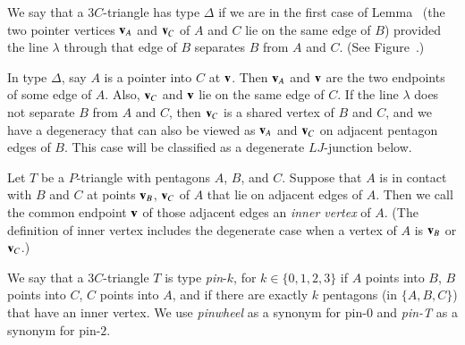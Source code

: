\begin{definition}[$\Delta$]
  We say that a $3C$-triangle has type $\Delta$ if we are in the first
  case of Lemma~ (the two pointer vertices ${\mathbf v}_A$ and
  ${\mathbf v}_C$ of $A$ and $C$ lie on the same edge of $B$) provided the line
  $\lambda$ through that edge of $B$ separates $B$ from $A$ and
  $C$. (See Figure~.)
\end{definition}



In type $\Delta$, say $A$ is a pointer into $C$ at ${\mathbf v}$.  Then ${\mathbf v}_A$
and ${\mathbf v}$ are the two endpoints of some edge of $A$.  Also, ${\mathbf v}_C$ and
${\mathbf v}$ lie on the same edge of $C$.  If the line $\lambda$ does not
separate $B$ from $A$ and $C$, then ${\mathbf v}_C$ is a shared vertex of $B$
and $C$, and we have a degeneracy that can also be viewed as ${\mathbf v}_A$
and ${\mathbf v}_C$ on adjacent pentagon edges of $B$.  This case will be
classified as a degenerate $LJ$-junction below.

\begin{definition} Let $T$ be a $P$-triangle with pentagons $A$, $B$,
  and $C$.  Suppose that $A$ is in contact with $B$ and $C$ at points
  ${\mathbf v}_B$, ${\mathbf v}_C$ of $A$ that lie on adjacent edges of $A$.  Then we
  call the common endpoint ${\mathbf v}$ of those adjacent edges an {\it inner
    vertex} of $A$.  (The definition of inner vertex includes the
  degenerate case when a vertex of $A$ is ${\mathbf v}_B$ or ${\mathbf v}_C$.)
\end{definition}

\begin{definition} We say that a $3C$-triangle $T$ is type {\it
    pin}-$k$, for $k\in \{0,1,2,3\}$ if $A$ points into $B$, $B$
  points into $C$, $C$ points into $A$, and if there are exactly $k$
  pentagons (in $\{A,B,C\}$) that have an inner vertex.  We use {\it
    pinwheel} as a synonym for pin-$0$ and {\it pin-T} as a synonym
  for pin-$2$.
\end{definition}


